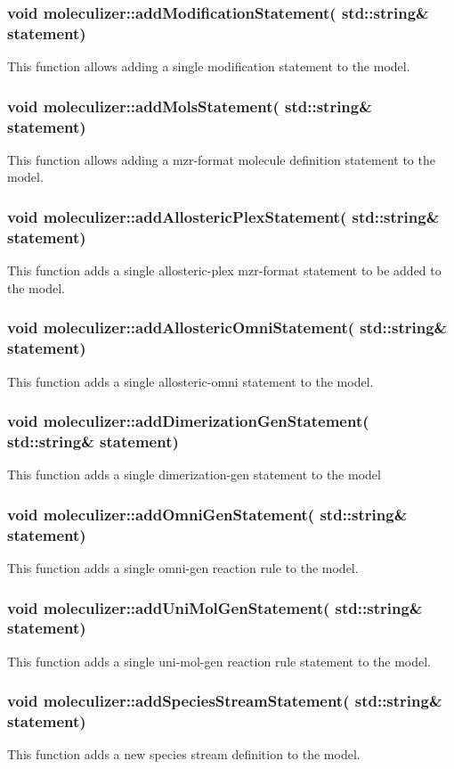 \subsubsection{void moleculizer::addModificationStatement( std::string\& statement)}
This function allows adding a single modification statement to the
model.  


\subsubsection{void moleculizer::addMolsStatement( std::string\& statement)}
This function allows adding a mzr-format  molecule definition statement to the
model.  

\subsubsection{void moleculizer::addAllostericPlexStatement( std::string\& statement)}
This function adds a single allosteric-plex mzr-format statement to be
added to the model.

\subsubsection{void moleculizer::addAllostericOmniStatement( std::string\& statement)}
This function adds a single allosteric-omni statement to the model.


\subsubsection{void moleculizer::addDimerizationGenStatement( std::string\& statement)}
This function adds a single dimerization-gen statement to the model

\subsubsection{void moleculizer::addOmniGenStatement( std::string\& statement)}
This function adds a single omni-gen reaction rule to the model.

\subsubsection{void moleculizer::addUniMolGenStatement( std::string\& statement)}
This function adds a single uni-mol-gen reaction rule statement to the model.

\subsubsection{void moleculizer::addSpeciesStreamStatement( std::string\& statement)}
This function adds a new species stream definition to the model.  


